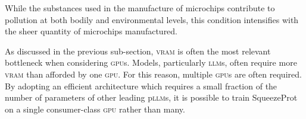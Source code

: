 \begin{displayquote}
\begin{singlespace}
While the substances used in the manufacture of microchips contribute to pollution at both bodily and environmental levels, this condition intensifies with the sheer quantity of microchips manufactured. \cite{silicon_elephants}
\end{singlespace}
\end{displayquote}

As discussed in the previous sub-section, \textsc{vram} is often the most relevant bottleneck when considering \textsc{gpu}s. Models, particularly \textsc{llm}s, often require more \textsc{vram} than afforded by one \textsc{gpu}. For this reason, multiple \textsc{gpu}s are often required. By adopting an efficient architecture which requires a small fraction of the number of parameters of other leading p\textsc{llm}s, it is possible to train SqueezeProt on a single consumer-class \textsc{gpu} rather than many.






